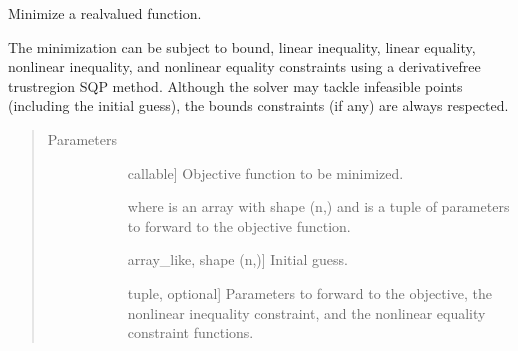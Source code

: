 \documentclass[letterpaper,10pt,english]{sphinxmanual}
\begin{document}
\begin{fulllineitems}
\label{\detokenize{refs/generated/cobyqa.minimize:cobyqa.minimize}}
\sphinxAtStartPar
Minimize a real\sphinxhyphen{}valued function.

\sphinxAtStartPar
The minimization can be subject to bound, linear inequality, linear
equality, nonlinear inequality, and nonlinear equality constraints using a
derivative\sphinxhyphen{}free trust\sphinxhyphen{}region SQP method. Although the solver may tackle
infeasible points (including the initial guess), the bounds constraints (if
any) are always respected.
\begin{quote}\begin{description}
\item[{Parameters}] \leavevmode\begin{description}
\item[{}] \leavevmode{[}callable{]}
\sphinxAtStartPar
Objective function to be minimized.
\begin{quote}

\sphinxAtStartPar
{}
\end{quote}

\sphinxAtStartPar
where  is an array with shape (n,) and  is a tuple of
parameters to forward to the objective function.

\item[{}] \leavevmode{[}array\_like, shape (n,){]}
\sphinxAtStartPar
Initial guess.

\item[{}] \leavevmode{[}tuple, optional{]}
\sphinxAtStartPar
Parameters to forward to the objective, the nonlinear inequality
constraint, and the nonlinear equality constraint functions.


\end{description}
\end{description}
\end{quote}
\end{fulllineitems}
\end{document}
